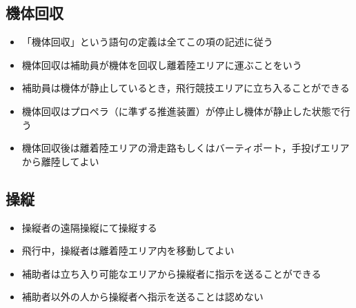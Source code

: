 \documentclass[a4paper,12pt,oneside]{jsarticle}
\begin{document}
\subsection{機体回収}
\begin{itemize}
  \item 「機体回収」という語句の定義は全てこの項の記述に従う
  \item 機体回収は補助員が機体を回収し離着陸エリアに運ぶことをいう
  \item 補助員は機体が静止しているとき，飛行競技エリアに立ち入ることができる
  \item 機体回収はプロペラ（に準ずる推進装置）が停止し機体が静止した状態で行う
  \item 機体回収後は離着陸エリアの滑走路もしくはバーティポート，手投げエリアから離陸してよい
\end{itemize}

\subsection{操縦}
\begin{itemize}
  \item 操縦者の遠隔操縦にて操縦する
  \item 飛行中，操縦者は離着陸エリア内を移動してよい
  \item 補助者は立ち入り可能なエリアから操縦者に指示を送ることができる
  \item 補助者以外の人から操縦者へ指示を送ることは認めない
\end{itemize}
\end{document}
